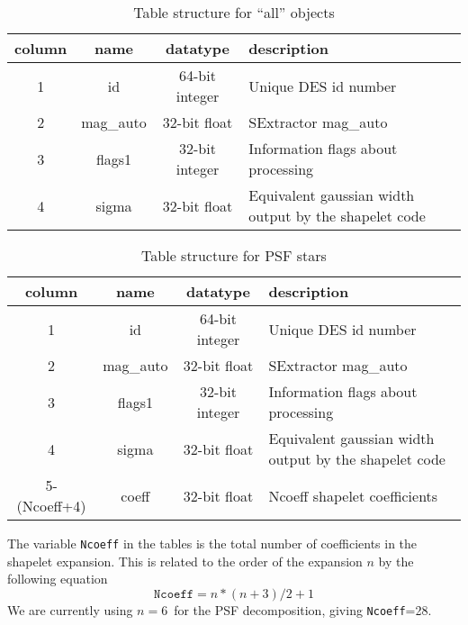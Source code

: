 \documentclass[12pt]{article}
\newcommand{\psforderval}{6}
\newcommand{\ncoeff}{\texttt{Ncoeff}}
\newcommand{\ncoeffval}{28}
\begin{document}
\begin{table}[p]
    \small
    \begin{tabular}{cccl}
    column & name & datatype & description\\
    \hline
    1 & id       & 64-bit integer &  Unique DES id number \\
    2 & mag\_auto & 32-bit float   & SExtractor mag\_auto \\
    3 & flags1   & 32-bit integer & Information flags about processing \\
    4 & sigma    & 32-bit float   & Equivalent gaussian width output by 
                                    the shapelet code \\
    \hline
    \end{tabular}
    \begin{center}
        \caption{Table structure for ``all'' objects \label{tab:allstruct}}
    \end{center}
    \normalsize
\end{table}
\begin{table}[p]
    \small
    \begin{tabular}{cccl}
    column & name & datatype & description\\
    \hline
    1 & id       & 64-bit integer &  Unique DES id number \\
    2 & mag\_auto & 32-bit float   & SExtractor mag\_auto \\
    3 & flags1   & 32-bit integer & Information flags about processing \\
    4 & sigma    & 32-bit float   & Equivalent gaussian width output by 
                                    the shapelet code \\
    5-(Ncoeff+4) & coeff & 32-bit float & Ncoeff shapelet coefficients \\
    \hline
    \end{tabular}
    \begin{center}
        \caption{Table structure for PSF stars \label{tab:psfstruct}}
    \end{center}
    \normalsize
\end{table}



The variable \texttt{Ncoeff} in the tables is the total number of coefficients
in the shapelet expansion.  This is related to the order of the expansion $n$ 
by the following equation
\begin{equation}
    \texttt{Ncoeff} = n*(n+3)/2 + 1
\end{equation}
We are currently using $n = $\psforderval\ for the PSF decomposition, giving
\ncoeff=\ncoeffval.
\end{document}

